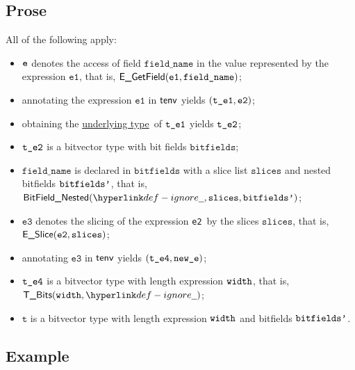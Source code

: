 \documentclass{book}
\newcommand\ProseOrTypeError[0]{\ProseTerminateAs{\TypeErrorConfig}}
\newcommand\underlyingtype[0]{\hyperlink{def-underlyingtype}{underlying type}}
\newcommand\vt[0]{\texttt{t}}
\newcommand\veone[0]{\texttt{e1}}
\newcommand\vetwo[0]{\texttt{e2}}
\newcommand\vethree[0]{\texttt{e3}}
\newcommand\bitfields[0]{\texttt{bitfields}}
\newcommand\fieldname[0]{\texttt{field\_name}}
\newcommand\slices[0]{\texttt{slices}}
\newcommand\newe[0]{\texttt{new\_e}}
\begin{document}
\subsection{Prose}
All of the following apply:
\begin{itemize}
  \item $\texttt{e}$ denotes the access of field $\fieldname$ in the value represented by the expression $\veone$, that is, $\EGetField(\veone, \fieldname)$;
  \item annotating the expression $\veone$ in $\textsf{tenv}$ yields $(\vteone, \vetwo)$\ProseOrTypeError;
  \item obtaining the \underlyingtype\ of $\texttt{t\_e1}$ yields $\texttt{t\_e2}$\ProseOrTypeError;
  \item $\texttt{t\_e2}$ is a bitvector type with bit fields $\bitfields$;
  \item $\fieldname$ is declared in $\bitfields$ with a slice list $\slices$ and nested bitfields $\texttt{bitfields'}$, that is,
        $\BitFieldNested(\Ignore, \slices, \bitfieldsp)$;
  \item $\vethree$ denotes the slicing of the expression \vetwo\ by the slices $\slices$, that is, \\ $\ESlice(\vetwo, \slices)$;
  \item annotating $\vethree$ in $\textsf{tenv}$ yields $(\vtefour, \newe)$\ProseOrTypeError;
  \item $\texttt{t\_e4}$ is a bitvector type with length expression $\texttt{width}$, that is, $\TBits(\width, \Ignore)$;
  \item $\vt$ is a bitvector type with length expression $\texttt{width}$ and bitfields $\texttt{bitfields'}$.
\end{itemize}

\subsection{Example}

\end{document}
